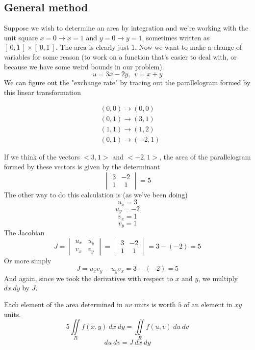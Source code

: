 \documentclass[11pt, oneside]{report}   	%
\begin{document}
\subsection*{General method}

Suppose we wish to determine an area by integration and we're working with the unit square $x=0 \to x=1$ and $y=0 \to y=1$, sometimes written as $[\ 0,1\ ] \times [\ 0,1\ ]$.  The area is clearly just $1$.  Now we want to make a change of variables for some reason (to work on a function that's easier to deal with, or because we have some weird bounds in our problem).
\[ u = 3x-2y , \ \ v = x + y \]
We can figure out the "exchange rate" by tracing out the parallelogram formed by this linear transformation

\begin{align*}
& (0,0) \to (0,0) \\
& (0,1) \to (3,1) \\
& (1,1) \to (1,2) \\
& (0,1) \to (-2,1)
\end{align*}

If we think of the vectors $<3,1>$ and $<-2,1>$, the area of the parallelogram formed by these vectors is given by the determinant
\[
\begin{vmatrix}
3 & -2 \\
1 & \ \ 1 
\end{vmatrix} = 5
\]
The other way to do this calculation is (as we've been doing)
\[ u_x = 3 \]
\[ u_y = -2 \]
\[ v_x = 1 \]
\[ v_y = 1 \]
The Jacobian
\[ J = 
\begin{vmatrix}
u_x & u_y \\
v_x & v_y 
\end{vmatrix} = 
\begin{vmatrix}
3 & -2 \\
1 & \ \ 1 
\end{vmatrix}
= 3 - (-2) = 5 \]
Or more simply
\[ J = u_x v_y - u_y v_x = 3  - (-2) = 5 \]
And again, since we took the derivatives with respect to $x$ and $y$, we multiply $dx \ dy$ by $J$.

Each element of the area determined in $uv$ units is worth $5$ of an element in $xy$ units.
\[ 5 \iint\limits_{R}  f(x,y) \ dx \ dy = \iint\limits_{R}  f(u,v) \ du \ dv \]
\begin{equation}
\boxed{du \ dv = J \ dx \ dy }
\end{equation}
\vspace{5 mm}
\end{document}
